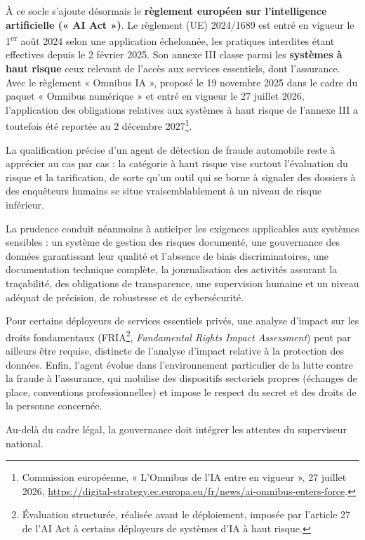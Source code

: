 À ce socle s'ajoute désormais le \textbf{règlement européen sur l'intelligence artificielle (« AI Act »)}. Le règlement (UE) 2024/1689 est entré en vigueur le 1\textsuperscript{er} août 2024 selon une application échelonnée, les pratiques interdites étant effectives depuis le 2 février 2025. Son annexe III classe parmi les \textbf{systèmes à haut risque} ceux relevant de l'accès aux services essentiels, dont l'assurance. Avec le règlement « Omnibus IA », proposé le 19 novembre 2025 dans le cadre du paquet « Omnibus numérique » et entré en vigueur le 27 juillet 2026, l'application des obligations relatives aux systèmes à haut risque de l'annexe III a toutefois été reportée au 2 décembre 2027\footnote{Commission européenne, « L'Omnibus de l'IA entre en vigueur », 27 juillet 2026, \url{https://digital-strategy.ec.europa.eu/fr/news/ai-omnibus-enters-force}.}.

La qualification précise d'un agent de détection de fraude automobile reste à apprécier au cas par cas : la catégorie à haut risque vise surtout l'évaluation du risque et la tarification, de sorte qu'un outil qui se borne à signaler des dossiers à des enquêteurs humains se situe vraisemblablement à un niveau de risque inférieur.

La prudence conduit néanmoins à anticiper les exigences applicables aux systèmes sensibles : un système de gestion des risques documenté, une gouvernance des données garantissant leur qualité et l'absence de biais discriminatoires, une documentation technique complète, la journalisation des activités assurant la traçabilité, des obligations de transparence, une supervision humaine et un niveau adéquat de précision, de robustesse et de cybersécurité.

Pour certains déployeurs de services essentiels privés, une analyse d'impact sur les droits fondamentaux (FRIA\footnote{Évaluation structurée, réalisée avant le déploiement, imposée par l'article 27 de l'AI Act à certains déployeurs de systèmes d'IA à haut risque.}, \textit{Fundamental Rights Impact Assessment}) peut par ailleurs être requise, distincte de l'analyse d'impact relative à la protection des données. Enfin, l'agent évolue dans l'environnement particulier de la lutte contre la fraude à l'assurance, qui mobilise des dispositifs sectoriels propres (échanges de place, conventions professionnelles) et impose le respect du secret et des droits de la personne concernée.

Au-delà du cadre légal, la gouvernance doit intégrer les attentes du superviseur national.

